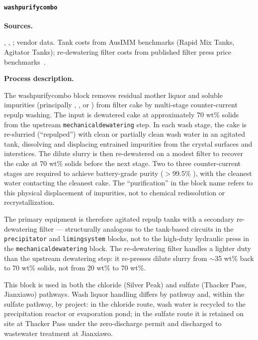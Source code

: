 \documentclass{article}
\renewcommand\_{\textunderscore\allowbreak}
\begin{document}
\clearpage
\paragraph{\texttt{wash\_purify\_combo}}\label{app:04-methods-blockdefs-washpurify}\leavevmode\par

\medskip
\noindent\textbf{Sources.}\quad

\citet{srkconsultingSECTechnicalReport2023a}, \citet{sgscanadaincSK1300Technical2024}, \citet{petersPlantDesignEconomics1991}; vendor data. Tank costs from AusIMM benchmarks (Rapid Mix Tanks, Agitator Tanks); re-dewatering filter costs from published filter press price benchmarks~\citet{porvooIndustrialFilterPress2025}. 


\medskip
\noindent\textbf{Process description.}\quad

The wash\_purify\_combo block removes residual mother liquor and soluble impurities (principally , ,  or ) from  filter cake by multi-stage counter-current repulp washing. The input is dewatered  cake at approximately 70 wt\% solids from the upstream \texttt{mechanical\_dewatering} step. In each wash stage, the cake is re-slurried (``repulped'') with clean or partially clean wash water in an agitated tank, dissolving and displacing entrained impurities from the crystal surfaces and interstices. The dilute slurry is then re-dewatered on a modest filter to recover the cake at 70 wt\% solids before the next stage. Two to three counter-current stages are required to achieve battery-grade purity ($>$99.5\% ), with the cleanest water contacting the cleanest cake. The ``purification'' in the block name refers to this physical displacement of impurities, not to chemical redissolution or recrystallization.

The primary equipment is therefore agitated repulp tanks with a secondary re-dewatering filter --- structurally analogous to the tank-based circuits in the \texttt{precipitator} and \texttt{liming\_system} blocks, not to the high-duty hydraulic press in the \texttt{mechanical\_dewatering} block. The re-dewatering filter handles a lighter duty than the upstream dewatering step: it re-presses dilute slurry from $\sim$35 wt\% back to 70 wt\% solids, not from 20 wt\% to 70 wt\%.

This block is used in both the chloride (Silver Peak) and sulfate (Thacker Pass, Jianxiawo) pathways. Wash liquor handling differs by pathway and, within the sulfate pathway, by project: in the chloride route, wash water is recycled to the precipitation reactor or evaporation pond; in the sulfate route it is retained on site at Thacker Pass under the zero-discharge permit and discharged to wastewater treatment at Jianxiawo.
\end{document}
